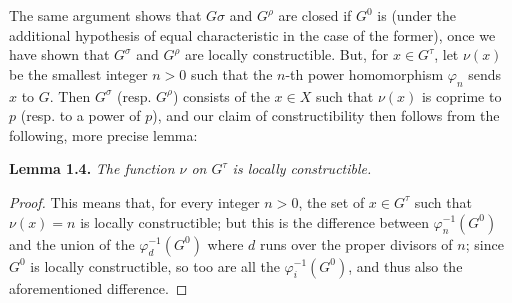 \documentclass{article}
\newenvironment{itenv}[1]
  {\phantomsection\par\smallskip\noindent\textbf{#1.}\itshape}
  {\par\smallskip}
\theoremstyle{definition}
\theoremstyle{definition}
\theoremstyle{definition}
\theoremstyle{definition}
\theoremstyle{remark}
\begin{document}
The same argument shows that \(G\sigma\) and \(G^\rho\) are closed if \(G^0\) is (under the additional hypothesis of equal characteristic in the case of the former), once we have shown that \(G^\sigma\) and \(G^\rho\) are locally constructible.
But, for \(x\in G^\tau\), let \(\nu(x)\) be the smallest integer \(n>0\) such that the \(n\)-th power homomorphism \(\varphi_n\) sends \(x\) to \(G\).
Then \(G^\sigma\) (resp. \(G^\rho\)) consists of the \(x\in X\) such that \(\nu(x)\) is coprime to \(p\) (resp. to a power of \(p\)), and our claim of constructibility then follows from the following, more precise lemma:

\leavevmode{}%
\begin{itenv}{Lemma 1.4}
The function \(\nu\) on \(G^\tau\) is locally constructible.

\end{itenv}

\begin{proof}
This means that, for every integer \(n>0\), the set of \(x\in G^\tau\) such that \(\nu(x)=n\) is locally constructible;
but this is the difference between \(\varphi_n^{-1}(G^0)\) and the union of the \(\varphi_d^{-1}(G^0)\) where \(d\) runs over the proper divisors of \(n\);
since \(G^0\) is locally constructible, so too are all the \(\varphi_i^{-1}(G^0)\), and thus also the aforementioned difference.
\end{proof}
\end{document}
